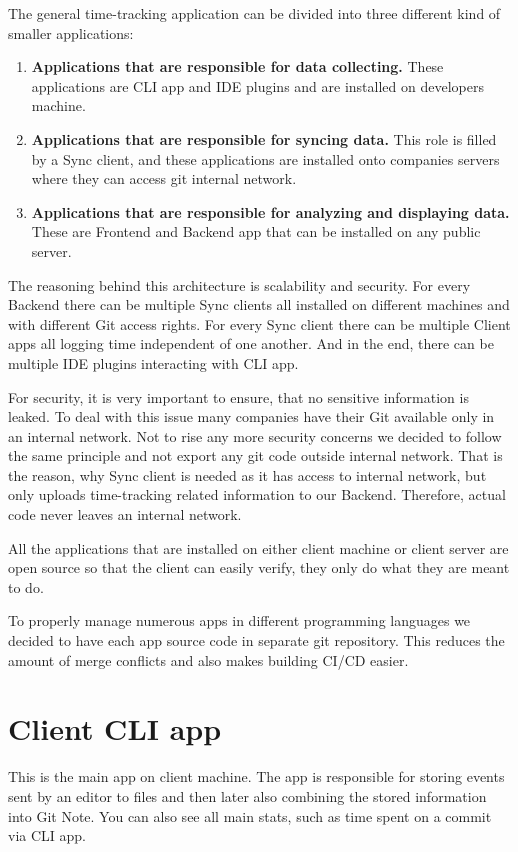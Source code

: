 The general time-tracking application can be divided into three different kind of smaller applications:
\begin{enumerate}
    \item \textbf{Applications that are responsible for data collecting.} These applications are CLI app and IDE plugins and are installed on developers machine.
    \item \textbf{Applications that are responsible for syncing data.} This role is filled by a Sync client, and these applications are installed onto companies servers where they can access git internal network.
    \item \textbf{Applications that are responsible for analyzing and displaying data.} These are Frontend and Backend app that can be installed on any public server.
\end{enumerate}

The reasoning behind this architecture is scalability and security.
For every Backend there can be multiple Sync clients all installed on different machines and with different Git access rights.
For every Sync client there can be multiple Client apps all logging time independent of one another.
And in the end, there can be multiple IDE plugins interacting with CLI app.

For security, it is very important to ensure, that no sensitive information is leaked.
To deal with this issue many companies have their Git available only in an internal network.
Not to rise any more security concerns we decided to follow the same principle and not export any git code outside internal network.
That is the reason, why Sync client is needed as it has access to internal network, but only uploads time-tracking related information to our Backend.
Therefore, actual code never leaves an internal network.

All the applications that are installed on either client machine or client server are open source so that the client can easily verify,
they only do what they are meant to do.

To properly manage numerous apps in different programming languages we decided to have each app source code in separate git repository.
This reduces the amount of merge conflicts and also makes building CI/CD easier.


\section{Client CLI app}\label{sec:cli-app}
This is the main app on client machine.
The app is responsible for storing events sent by an editor to files and then later also combining the stored information into Git Note.
You can also see all main stats, such as time spent on a commit via CLI app.

